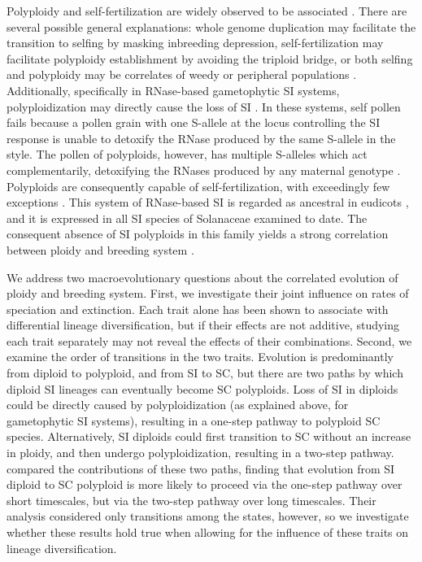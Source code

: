 Polyploidy and self-fertilization are widely observed to be associated \citep{stebbins1950}.
There are several possible general explanations: whole genome duplication may facilitate the transition to selfing by masking inbreeding depression, self-fertilization may facilitate polyploidy establishment by avoiding the triploid bridge, or both selfing and polyploidy may be correlates of weedy or peripheral populations \citep{ramsey_1998, barringer2007, barrett2008, husband2008}.
Additionally, specifically in RNase-based gametophytic SI systems, polyploidization may directly cause the loss of SI \citep{stout1942, lewis1947}.
In these systems, self pollen fails because a pollen grain with one S-allele at the locus controlling the SI response is unable to detoxify the RNase produced by the same S-allele in the style. %
The pollen of polyploids, however, has multiple S-alleles which act complementarily, detoxifying the RNases produced by any maternal genotype \citep{entani1999, tsukamoto2005, kubo2010}.
Polyploids are consequently capable of self-fertilization, with exceedingly few exceptions \citep{hauck_2002, nunes_2006}.
This system of RNase-based SI is regarded as ancestral in eudicots \citep{igic_2001,steinbachs_2002}, and it is expressed in all SI species of Solanaceae examined to date.
The consequent absence of SI polyploids in this family yields a strong correlation between ploidy and breeding system \citep{robertson_2011}.

We address two macroevolutionary questions about the correlated evolution of ploidy and breeding system.
First, we investigate their joint influence on rates of speciation and extinction.
Each trait alone has been shown to associate with differential lineage diversification, but if their effects are not additive, studying each trait separately may not reveal the effects of their combinations.
Second, we examine the order of transitions in the two traits.
Evolution is predominantly from diploid to polyploid, and from SI to SC, but there are two paths by which diploid SI lineages can eventually become SC polyploids.
Loss of SI in diploids could be directly caused by polyploidization (as explained above, for gametophytic SI systems), resulting in a one-step pathway to polyploid SC species. 
Alternatively, SI diploids could first transition to SC without an increase in ploidy, and then undergo polyploidization, resulting in a two-step pathway.
\citet{robertson_2011} compared the contributions of these two paths, finding that evolution from SI diploid to SC polyploid is more likely to proceed via the one-step pathway over short timescales, but via the two-step pathway over long timescales.
Their analysis considered only transitions among the states, however, so we investigate whether these results hold true when allowing for the influence of these traits on lineage diversification.

